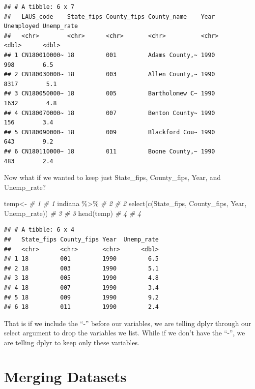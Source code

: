\documentclass[
]{book}
\newenvironment{Shaded}{\begin{snugshade}}{\end{snugshade}}
\newcommand{\CommentTok}[1]{\textcolor[rgb]{0.56,0.35,0.01}{\textit{#1}}}
\newcommand{\FunctionTok}[1]{\textcolor[rgb]{0.00,0.00,0.00}{#1}}
\newcommand{\NormalTok}[1]{#1}
\newcommand{\OtherTok}[1]{\textcolor[rgb]{0.56,0.35,0.01}{#1}}
\newcommand{\SpecialCharTok}[1]{\textcolor[rgb]{0.00,0.00,0.00}{#1}}
\begin{document}
\begin{verbatim}
## # A tibble: 6 x 7
##   LAUS_code    State_fips County_fips County_name    Year  Unemployed Unemp_rate
##   <chr>        <chr>      <chr>       <chr>          <chr>      <dbl>      <dbl>
## 1 CN180010000~ 18         001         Adams County,~ 1990         998        6.5
## 2 CN180030000~ 18         003         Allen County,~ 1990        8317        5.1
## 3 CN180050000~ 18         005         Bartholomew C~ 1990        1632        4.8
## 4 CN180070000~ 18         007         Benton County~ 1990         156        3.4
## 5 CN180090000~ 18         009         Blackford Cou~ 1990         643        9.2
## 6 CN180110000~ 18         011         Boone County,~ 1990         483        2.4
\end{verbatim}

Now what if we wanted to keep just State\_fips, County\_fips, Year, and Unemp\_rate?

\begin{Shaded}
\begin{Highlighting}[]
\NormalTok{temp}\OtherTok{\textless{}{-}}                                                  \CommentTok{\# 1  \# 1}
\NormalTok{  indiana }\SpecialCharTok{\%\textgreater{}\%}                                           \CommentTok{\# 2  \# 2}
  \FunctionTok{select}\NormalTok{(}\FunctionTok{c}\NormalTok{(State\_fips, County\_fips, Year, Unemp\_rate))  }\CommentTok{\# 3  \# 3}
\FunctionTok{head}\NormalTok{(temp)                                              }\CommentTok{\# 4  \# 4}
\end{Highlighting}
\end{Shaded}

\begin{verbatim}
## # A tibble: 6 x 4
##   State_fips County_fips Year  Unemp_rate
##   <chr>      <chr>       <chr>      <dbl>
## 1 18         001         1990         6.5
## 2 18         003         1990         5.1
## 3 18         005         1990         4.8
## 4 18         007         1990         3.4
## 5 18         009         1990         9.2
## 6 18         011         1990         2.4
\end{verbatim}

That is if we include the ``-'' before our variables, we are telling dplyr through our select argument to drop the variables we list. While if we don't have the ``-'', we are telling dplyr to keep only these variables.

\hypertarget{merging-datasets}{%
\section{Merging Datasets}\label{merging-datasets}}
\end{document}
